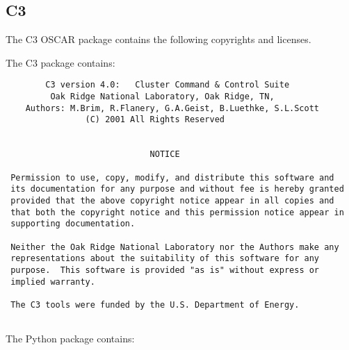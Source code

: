 %
%
% 
% 
% 
% 
%

\subsection{C3}
The C3 OSCAR package contains the following copyrights and licenses.

The C3 package contains:

\begin{verbatim}
        C3 version 4.0:   Cluster Command & Control Suite
         Oak Ridge National Laboratory, Oak Ridge, TN,
    Authors: M.Brim, R.Flanery, G.A.Geist, B.Luethke, S.L.Scott
                (C) 2001 All Rights Reserved


                             NOTICE

 Permission to use, copy, modify, and distribute this software and
 its documentation for any purpose and without fee is hereby granted
 provided that the above copyright notice appear in all copies and
 that both the copyright notice and this permission notice appear in
 supporting documentation.

 Neither the Oak Ridge National Laboratory nor the Authors make any
 representations about the suitability of this software for any
 purpose.  This software is provided "as is" without express or
 implied warranty.

 The C3 tools were funded by the U.S. Department of Energy.


\end{verbatim}

The Python package contains:

